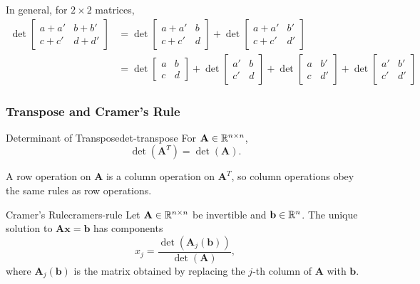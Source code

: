 \begin{example}
  In general, for $2 \times 2$ matrices,
  \begin{align*}
    \det
    \begin{bmatrix}
      a + a' & b + b' \\ c + c' & d + d'
    \end{bmatrix}
     & = \det
    \begin{bmatrix}
      a + a' & b \\ c + c' & d
    \end{bmatrix}
    + \det
    \begin{bmatrix}
      a + a' & b' \\ c + c' & d'
    \end{bmatrix}
    \\
     & = \det
    \begin{bmatrix}
      a & b \\ c & d
    \end{bmatrix}
    + \det
    \begin{bmatrix}
      a' & b \\ c' & d
    \end{bmatrix}
    + \det
    \begin{bmatrix}
      a & b' \\ c & d'
    \end{bmatrix}
    + \det
    \begin{bmatrix}
      a' & b' \\ c' & d'
    \end{bmatrix}
  \end{align*}
\end{example}

\subsubsection{Transpose and Cramer's Rule}

\begin{theorem}{Determinant of Transpose}{det-transpose}
  For $\mathbf{A} \in \mathbb{R}^{n \times n}$,
  \[
    \det(\mathbf{A}^T) = \det(\mathbf{A}).
  \]
\end{theorem}

A row operation on $\mathbf{A}$ is a column operation on $\mathbf{A}^T$, so column operations obey the same rules as row operations.

\begin{theorem}{Cramer's Rule}{cramers-rule}
  Let $\mathbf{A} \in \mathbb{R}^{n \times n}$ be invertible and $\mathbf{b} \in \mathbb{R}^n$. The unique solution to $\mathbf{A}\mathbf{x} = \mathbf{b}$ has components
  \[
    x_j = \frac{\det(\mathbf{A}_j(\mathbf{b}))}{\det(\mathbf{A})},
  \]
  where $\mathbf{A}_j(\mathbf{b})$ is the matrix obtained by replacing the $j$-th column of $\mathbf{A}$ with $\mathbf{b}$.
\end{theorem}

